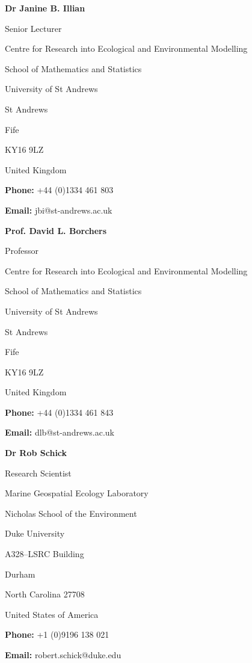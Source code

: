 \documentclass[10pt,a4paper]{moderncv}
\begin{document}

\vspace{6pt}
 
\textbf{Dr Janine B. Illian}

Senior Lecturer

Centre for Research into Ecological and Environmental Modelling

School of Mathematics and Statistics

University of St Andrews

St Andrews

Fife

KY16 9LZ

United Kingdom

\textbf{Phone:} +44 (0)1334 461 803

\textbf{Email:} jbi@st-andrews.ac.uk

\vspace{6pt}
 
\textbf{Prof. David L. Borchers}

Professor

Centre for Research into Ecological and Environmental Modelling

School of Mathematics and Statistics

University of St Andrews

St Andrews

Fife

KY16 9LZ

United Kingdom

\textbf{Phone:} +44 (0)1334 461 843

\textbf{Email:} dlb@st-andrews.ac.uk

\vspace{6pt}
 
\textbf{Dr Rob Schick}

Research Scientist

Marine Geospatial Ecology Laboratory

Nicholas School of the Environment 

Duke University 

A328–LSRC Building

Durham

North Carolina 27708

United States of America

\textbf{Phone:} +1 (0)9196 138 021

\textbf{Email:} robert.schick@duke.edu


\end{document}
